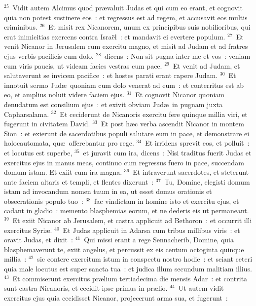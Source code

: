 ${}^{25}$~Vidit autem Alcimus quod pr\ae valuit Judas et qui cum eo erant, et cognovit quia non potest sustinere eos~: et regressus est ad regem, et accusavit eos multis criminibus.
${}^{26}$~Et misit rex Nicanorem, unum ex principibus suis nobilioribus, qui erat inimicitias exercens contra Isra\"el~: et mandavit ei evertere populum.
${}^{27}$~Et venit Nicanor in Jerusalem cum exercitu magno, et misit ad Judam et ad fratres ejus verbis pacificis cum dolo,
${}^{28}$~dicens~: Non sit pugna inter me et vos~: veniam cum viris paucis, ut videam facies vestras cum pace.
${}^{29}$~Et venit ad Judam, et salutaverunt se invicem pacifice~: et hostes parati erant rapere Judam.
${}^{30}$~Et innotuit sermo Jud\ae\ quoniam cum dolo venerat ad eum~: et conterritus est ab eo, et amplius noluit videre faciem ejus.
${}^{31}$~Et cognovit Nicanor quoniam denudatum est consilium ejus~: et exivit obviam Jud\ae\ in pugnam juxta Capharsalama.
${}^{32}$~Et ceciderunt de Nicanoris exercitu fere quinque millia viri, et fugerunt in civitatem David.
${}^{33}$~Et post h\ae c verba ascendit Nicanor in montem Sion~: et exierunt de sacerdotibus populi salutare eum in pace, et demonstrare ei holocautomata, qu\ae\ offerebantur pro rege.
${}^{34}$~Et irridens sprevit eos, et polluit~: et locutus est superbe,
${}^{35}$~et juravit cum ira, dicens~: Nisi traditus fuerit Judas et exercitus ejus in manus meas, continuo cum regressus fuero in pace, succendam domum istam. Et exiit cum ira magna.
${}^{36}$~Et intraverunt sacerdotes, et steterunt ante faciem altaris et templi, et flentes dixerunt~:
${}^{37}$~Tu, Domine, elegisti domum istam ad invocandum nomen tuum in ea, ut esset domus orationis et obsecrationis populo tuo~:
${}^{38}$~fac vindictam in homine isto et exercitu ejus, et cadant in gladio~: memento blasphemias eorum, et ne dederis eis ut permaneant.
${}^{39}$~Et exiit Nicanor ab Jerusalem, et castra applicuit ad Bethoron~: et occurrit illi exercitus Syri\ae .
${}^{40}$~Et Judas applicuit in Adarsa cum tribus millibus viris~: et oravit Judas, et dixit~:
${}^{41}$~Qui missi erant a rege Sennacherib, Domine, quia blasphemaverunt te, exiit angelus, et percussit ex eis centum octoginta quinque millia~:
${}^{42}$~sic contere exercitum istum in conspectu nostro hodie~: et sciant ceteri quia male locutus est super sancta tua~: et judica illum secundum malitiam illius.
${}^{43}$~Et commiserunt exercitus pr\ae lium tertiadecima die mensis Adar~: et contrita sunt castra Nicanoris, et cecidit ipse primus in pr\ae lio.
${}^{44}$~Ut autem vidit exercitus ejus quia cecidisset Nicanor, projecerunt arma sua, et fugerunt~:
